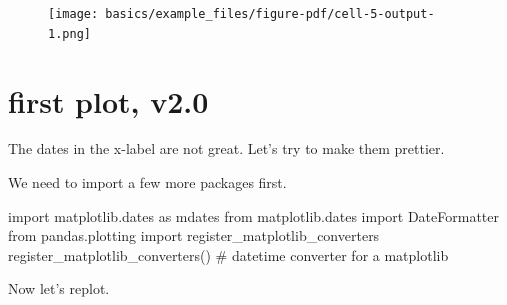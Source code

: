 \documentclass[
  letterpaper,
  DIV=11,
  numbers=noendperiod,
  oneside]{scrreprt}
\newenvironment{Shaded}{\begin{snugshade}}{\end{snugshade}}
\newcommand{\CommentTok}[1]{\textcolor[rgb]{0.37,0.37,0.37}{#1}}
\newcommand{\ImportTok}[1]{\textcolor[rgb]{0.00,0.46,0.62}{#1}}
\newcommand{\NormalTok}[1]{\textcolor[rgb]{0.00,0.23,0.31}{#1}}
\begin{document}
\begin{figure}[H]

{\centering \texttt{[image: basics/example\_files/figure-pdf/cell-5-output-1.png]}

}

\end{figure}

\hypertarget{first-plot-v2.0}{%
\section{first plot, v2.0}\label{first-plot-v2.0}}

The dates in the x-label are not great. Let's try to make them prettier.

We need to import a few more packages first.

\begin{Shaded}
\begin{Highlighting}[]
\ImportTok{import}\NormalTok{ matplotlib.dates }\ImportTok{as}\NormalTok{ mdates}
\ImportTok{from}\NormalTok{ matplotlib.dates }\ImportTok{import}\NormalTok{ DateFormatter}
\ImportTok{from}\NormalTok{ pandas.plotting }\ImportTok{import}\NormalTok{ register\_matplotlib\_converters}
\NormalTok{register\_matplotlib\_converters()  }\CommentTok{\# datetime converter for a matplotlib}
\end{Highlighting}
\end{Shaded}

Now let's replot.
\end{document}

